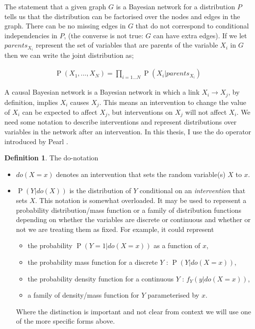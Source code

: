 \documentclass[11pt,a4paper,twoside]{report}
\newcommand{\eqn}[1]{\begin{align}#1\end{align}}
\renewcommand{\P}[1]{\operatorname{P}\left(#1\right)}
\theoremstyle{plain}
\theoremstyle{definition}
\newtheorem{definition}[theorem]{Definition}
\begin{document}
The statement that a given graph $G$ is a Bayesian network for a distribution $P$ tells us that the distribution can be factorised over the nodes and edges in the graph. There can be no missing edges in $G$ that do not correspond to conditional independencies in $P$, (the converse is not true: $G$ can have extra edges). If we let $parents_{X_{i}}$ represent the set of variables that are parents of the variable $X_{i}$ in $G$ then we can write the joint distribution as; 

\eqn{
\P{X_{1},...,X_{N}} = \prod_{i = 1...N}\P{X_{i}|parents_{X_{i}}}
}

A causal Bayesian network is a Bayesian network in which a link $X_{i} \rightarrow X_{j}$, by definition, implies $X_{i}$ causes $X_{j}$. This means an intervention to change the value of $X_{i}$ can be expected to affect $X_{j}$, but interventions on $X_{j}$ will not affect $X_{i}$. We need some notation to describe interventions and represent distributions over variables in the network after an intervention. In this thesis, I use the do operator introduced by Pearl \citep{Pearl2000}.

\vspace{0.5cm}
\begin{definition}{The do-notation}
\begin{itemize}
\item $do(X=x)$ denotes an intervention that sets the random variable(s) $X$ to $x$.
\item $\P{Y|do(X)}$ is the distribution of $Y$ conditional on an \emph{intervention} that sets $X$. This notation is somewhat overloaded. It may be used to represent a probability distribution/mass function or a family of distribution functions depending on whether the variables are discrete or continuous and whether or not we are treating them as fixed. For example, it could represent 
\begin{itemize}
\item the probability $\P{Y=1|do(X=x)}$ as a function of $x$,
\item the probability mass function for a discrete $Y$ : $\P{Y|do(X=x)}$,
\item the probability density function for a continuous  $Y$ : $f_Y(y|do(X=x))$,
\item a family of density/mass function for $Y$ parameterised by $x$.
\end{itemize}
Where the distinction is important and not clear from context we will use one of the more specific forms above. 
\end{itemize}
\end{definition}
\end{document}
